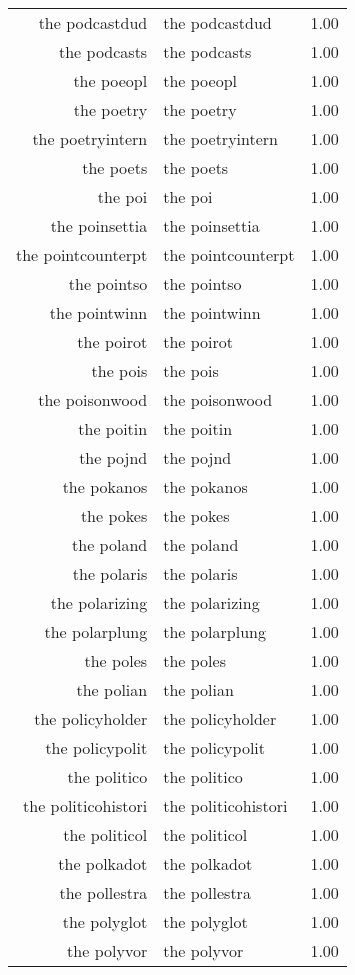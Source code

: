 \begin{table}[ht]
\begin{tabular}{rlr}
  the podcastdud & the podcastdud & 1.00 \\ 
  the podcasts & the podcasts & 1.00 \\ 
  the poeopl & the poeopl & 1.00 \\ 
  the poetry & the poetry & 1.00 \\ 
  the poetryintern & the poetryintern & 1.00 \\ 
  the poets & the poets & 1.00 \\ 
  the poi & the poi & 1.00 \\ 
  the poinsettia & the poinsettia & 1.00 \\ 
  the pointcounterpt & the pointcounterpt & 1.00 \\ 
  the pointso & the pointso & 1.00 \\ 
  the pointwinn & the pointwinn & 1.00 \\ 
  the poirot & the poirot & 1.00 \\ 
  the pois & the pois & 1.00 \\ 
  the poisonwood & the poisonwood & 1.00 \\ 
  the poitin & the poitin & 1.00 \\ 
  the pojnd & the pojnd & 1.00 \\ 
  the pokanos & the pokanos & 1.00 \\ 
  the pokes & the pokes & 1.00 \\ 
  the poland & the poland & 1.00 \\ 
  the polaris & the polaris & 1.00 \\ 
  the polarizing & the polarizing & 1.00 \\ 
  the polarplung & the polarplung & 1.00 \\ 
  the poles & the poles & 1.00 \\ 
  the polian & the polian & 1.00 \\ 
  the policyholder & the policyholder & 1.00 \\ 
  the policypolit & the policypolit & 1.00 \\ 
  the politico & the politico & 1.00 \\ 
  the politicohistori & the politicohistori & 1.00 \\ 
  the politicol & the politicol & 1.00 \\ 
  the polkadot & the polkadot & 1.00 \\ 
  the pollestra & the pollestra & 1.00 \\ 
  the polyglot & the polyglot & 1.00 \\ 
  the polyvor & the polyvor & 1.00 \\ 

\end{tabular}
\end{table}
